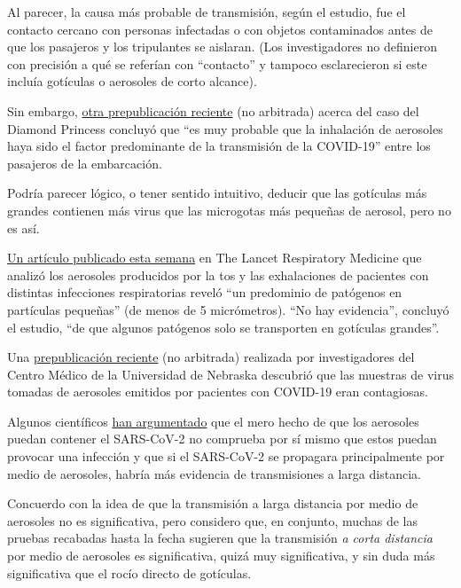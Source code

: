 Al parecer, la causa más probable de transmisión, según el estudio, fue
el contacto cercano con personas infectadas o con objetos contaminados
antes de que los pasajeros y los tripulantes se aislaran. (Los
investigadores no definieron con precisión a qué se referían con
``contacto'' y tampoco esclarecieron si este incluía gotículas o
aerosoles de corto alcance).

Sin embargo,
\href{https://www.medrxiv.org/content/10.1101/2020.07.13.20153049v1}{otra
prepublicación reciente} (no arbitrada) acerca del caso del Diamond
Princess concluyó que ``es muy probable que la inhalación de aerosoles
haya sido el factor predominante de la transmisión de la COVID-19''
entre los pasajeros de la embarcación.

Podría parecer lógico, o tener sentido intuitivo, deducir que las
gotículas más grandes contienen más virus que las microgotas más
pequeñas de aerosol, pero no es así.

\href{https://www.thelancet.com/journals/lanres/article/PIIS2213-2600(20)30323-4/fulltext}{Un
artículo publicado esta semana} en The Lancet Respiratory Medicine que
analizó los aerosoles producidos por la tos y las exhalaciones de
pacientes con distintas infecciones respiratorias reveló ``un predominio
de patógenos en partículas pequeñas'' (de menos de 5 micrómetros). ``No
hay evidencia'', concluyó el estudio, ``de que algunos patógenos solo se
transporten en gotículas grandes''.

Una
\href{https://www.medrxiv.org/content/10.1101/2020.07.13.20041632v2}{prepublicación
reciente} (no arbitrada) realizada por investigadores del Centro Médico
de la Universidad de Nebraska descubrió que las muestras de virus
tomadas de aerosoles emitidos por pacientes con COVID-19 eran
contagiosas.

Algunos científicos
\href{https://jamanetwork.com/journals/jama/fullarticle/2768396}{han
argumentado} que el mero hecho de que los aerosoles puedan contener el
SARS-CoV-2 no comprueba por sí mismo que estos puedan provocar una
infección y que si el SARS-CoV-2 se propagara principalmente por medio
de aerosoles, habría más evidencia de transmisiones a larga distancia.

Concuerdo con la idea de que la transmisión a larga distancia por medio
de aerosoles no es significativa, pero considero que, en conjunto,
muchas de las pruebas recabadas hasta la fecha sugieren que la
transmisión \emph{a corta distancia} por medio de aerosoles es
significativa, quizá muy significativa, y sin duda más significativa que
el rocío directo de gotículas.

